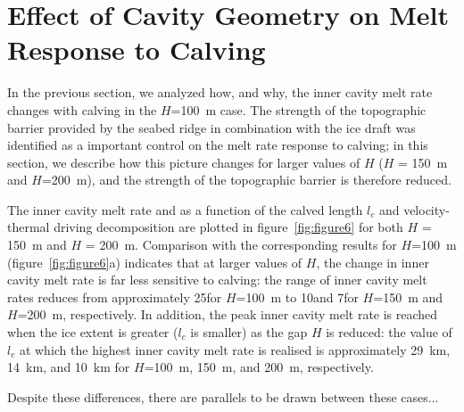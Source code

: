 \documentclass[draft]{agujournal2019}
\begin{document}
\section{Effect of Cavity Geometry on Melt Response to Calving}\label{S:Results:H}
In the previous section, we analyzed how, and why, the inner cavity melt rate changes with calving in the $H$=100~m case. The strength of the topographic barrier provided by the seabed ridge in combination with the ice draft was identified as a important control on the melt rate response to calving; in this section, we describe how this picture changes for larger values of $H$ ($H$ = 150~m and $H$=200~m), and the strength of the topographic barrier is therefore reduced.

The inner cavity melt rate and as a function of the calved length $l_c$ and velocity-thermal driving decomposition are plotted in figure~\ref{fig:figure6} for both $H$ = 150~m and $H$ = 200~m. Comparison with the corresponding results for $H$=100~m (figure~\ref{fig:figure6}a) indicates that at larger values of $H$, the change in inner cavity melt rate is far less sensitive to calving: the range of inner cavity melt rates reduces from approximately 25\mpryr for $H$=100~m to 10\mpryr and 7\mpryr for $H$=150~m and $H$=200~m, respectively. In addition, the peak inner cavity melt rate is reached when the ice extent is greater ($l_c$ is smaller) as the gap $H$ is reduced: the value of $l_c$ at which the highest inner cavity melt rate is realised is approximately 29~km, 14~km, and 10~km for $H$=100~m, 150~m, and 200~m, respectively.

Despite these differences, there are parallels to be drawn between these cases...
\end{document}
